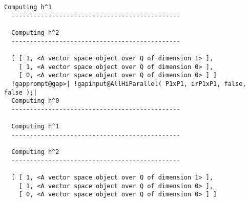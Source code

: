 \documentclass[a4paper,11pt]{report}
\begin{document}
{{{\begin{Verbatim}[commandchars=!@|,fontsize=\small,frame=single,label=Example]
  Computing h^1
  ----------------------------------------------
  
  Computing h^2
  ----------------------------------------------
  
  [ [ 1, <A vector space object over Q of dimension 1> ],
    [ 1, <A vector space object over Q of dimension 0> ],
    [ 0, <A vector space object over Q of dimension 0> ] ]
  !gapprompt@gap>| !gapinput@AllHiParallel( P1xP1, irP1xP1, false, false );|
  Computing h^0
  ----------------------------------------------
  
  Computing h^1
  ----------------------------------------------
  
  Computing h^2
  ----------------------------------------------
  
  [ [ 1, <A vector space object over Q of dimension 1> ],
    [ 1, <A vector space object over Q of dimension 0> ],
    [ 0, <A vector space object over Q of dimension 0> ] ]
\end{Verbatim}
 }

 }

 }

   
\end{document}

